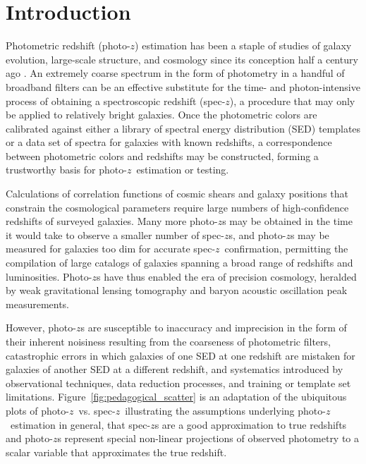\documentclass[iop]{emulateapj}
\newcommand{\todo}[3]{{\color{#2}\emph{#1}: #3}}
\newcommand{\aim}[1]{\todo{AIM}{red}{#1}}
\newcommand{\repo}[1]{\texttt{#1}}
\newcommand{\chippr}{\repo{chippr}}
\newcommand{\sz}{spec-$z$}
\newcommand{\pz}{photo-$z$}
\newcommand{\Pz}{Photo-$z$}
\newcommand{\pzpdf}{\pz\ posterior PDF}%
\begin{document}

\maketitle


\section{Introduction}
\label{sec:intro}

Photometric redshift (\pz) estimation has been a staple of studies of galaxy evolution, large-scale structure, and cosmology since its conception half a century ago \citep{baum_photoelectric_1962}.
An extremely coarse spectrum in the form of photometry in a handful of broadband filters can be an effective substitute for the time- and photon-intensive process of obtaining a spectroscopic redshift (\sz), a procedure that may only be applied to relatively bright galaxies.
Once the photometric colors are calibrated against either a library of spectral energy distribution (SED) templates or a data set of spectra for galaxies with known redshifts, a correspondence between photometric colors and redshifts may be constructed, forming a trustworthy basis for \pz\ estimation or testing.

Calculations of correlation functions of cosmic shears and galaxy positions that constrain the cosmological parameters require large numbers of high-confidence redshifts of surveyed galaxies.
Many more \pz s may be obtained in the time it would take to observe a smaller number of \sz s, and \pz s may be measured for galaxies too dim for accurate \sz\ confirmation, permitting the compilation of large catalogs of galaxies spanning a broad range of redshifts and luminosities.
\Pz s have thus enabled the era of precision cosmology, heralded by weak gravitational lensing tomography and baryon acoustic oscillation peak measurements.

However, \pz s are susceptible to inaccuracy and imprecision in the form of their inherent noisiness resulting from the coarseness of photometric filters, catastrophic errors in which galaxies of one SED at one redshift are mistaken for galaxies of another SED at a different redshift, and systematics introduced by observational techniques, data reduction processes, and training or template set limitations.
Figure~\ref{fig:pedagogical_scatter} is an adaptation of the ubiquitous plots of \pz\ vs. \sz\ illustrating the assumptions underlying \pz\ estimation in general, that \sz s are a good approximation to true redshifts and \pz s represent special non-linear projections of observed photometry to a scalar variable that approximates the true redshift.
\end{document}
